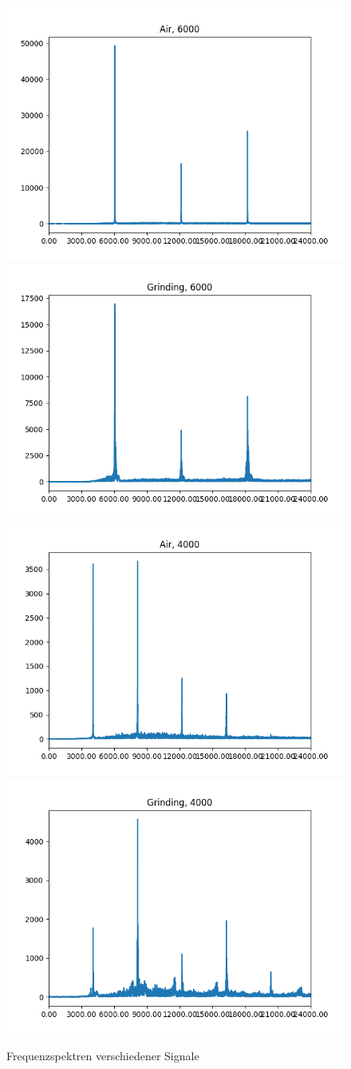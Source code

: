 \begin{figure}[H]
    \includegraphics[width=0.5\linewidth]{Studienarbeit//images/Air, 6000, FFT.png}    
    \includegraphics[width=0.5\linewidth]{Studienarbeit//images/Grinding, 6000, FFT.png}
    \includegraphics[width=0.5\linewidth]{Studienarbeit//images/Air, 4000, FFT.png}
    \includegraphics[width=0.5\linewidth]{Studienarbeit//images/Grinding, 4000, FFT.png}
    \caption{Frequenzspektren verschiedener Signale}
    \label{fig:frequenzspektren-fft}
\end{figure}


